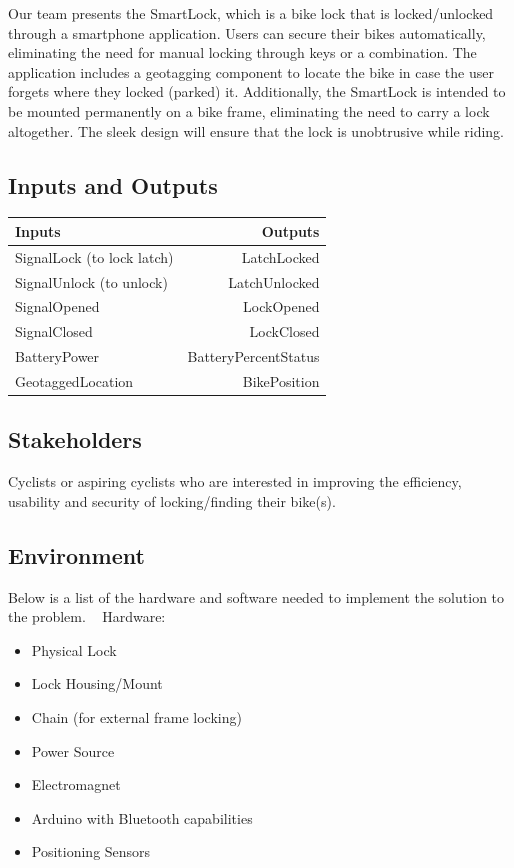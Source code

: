 \documentclass{article}
\begin{document}
Our team presents the SmartLock, which is a bike lock that is locked/unlocked through a smartphone application.  Users can secure their bikes automatically, eliminating the need for manual locking through keys or a combination.  The application includes a geotagging component to locate the bike in case the user forgets where they locked (parked) it.  Additionally, the SmartLock is intended to be mounted permanently on a bike frame, eliminating the need to carry a lock altogether.  The sleek design will ensure that the lock is unobtrusive while riding. 


\subsection{Inputs and Outputs}

\begin{table}[hp]
  \begin{center}
    \begin{tabular}{| l | r |}
    \hline
      \textbf{Inputs} & \textbf{Outputs}\\
      \hline
      SignalLock (to lock latch)  & LatchLocked\\
	    SignalUnlock (to unlock) & LatchUnlocked\\
	    SignalOpened & LockOpened\\
	    SignalClosed & LockClosed\\
	    BatteryPower & BatteryPercentStatus\\
	    GeotaggedLocation & BikePosition\\
	    \hline
    \end{tabular}
  \end{center}
\end{table}

\subsection{Stakeholders}

Cyclists or aspiring cyclists who are interested in improving the efficiency, usability and security of locking/finding their bike(s).

\newpage
\subsection{Environment}

Below is a list of the hardware and software needed to implement the solution to the problem.
~\newline
Hardware:
\begin{itemize}
\item Physical Lock
\item Lock Housing/Mount
\item Chain (for external frame locking)
\item Power Source
\item Electromagnet
\item Arduino with Bluetooth capabilities
\item Positioning Sensors
\end{itemize}
\end{document}
